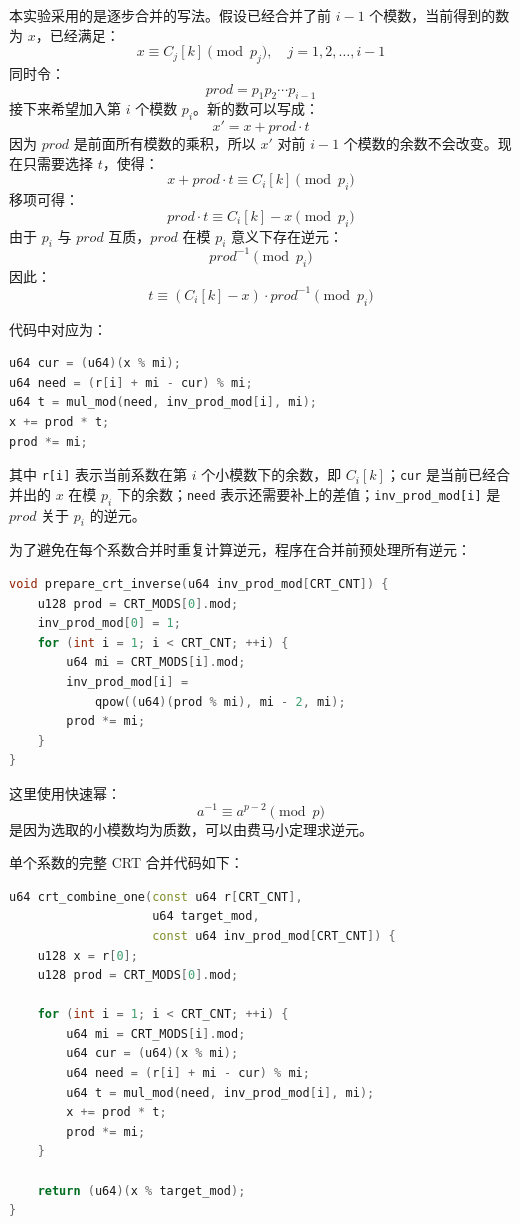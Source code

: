 \documentclass[a4paper]{article}
\begin{document}
本实验采用的是逐步合并的写法。假设已经合并了前 $i-1$ 个模数，当前得到的数为 $x$，已经满足：
\[
x\equiv C_j[k]\pmod {p_j},\quad j=1,2,\ldots,i-1
\]
同时令：
\[
prod=p_1p_2\cdots p_{i-1}
\]
接下来希望加入第 $i$ 个模数 $p_i$。新的数可以写成：
\[
x'=x+prod\cdot t
\]
因为 $prod$ 是前面所有模数的乘积，所以 $x'$ 对前 $i-1$ 个模数的余数不会改变。现在只需要选择 $t$，使得：
\[
x+prod\cdot t\equiv C_i[k]\pmod {p_i}
\]
移项可得：
\[
prod\cdot t\equiv C_i[k]-x\pmod {p_i}
\]
由于 $p_i$ 与 $prod$ 互质，$prod$ 在模 $p_i$ 意义下存在逆元：
\[
prod^{-1}\pmod {p_i}
\]
因此：
\[
t\equiv (C_i[k]-x)\cdot prod^{-1}\pmod {p_i}
\]

代码中对应为：

\begin{lstlisting}[title=CRT 单步合并公式,frame=trbl,language={C++}]
u64 cur = (u64)(x % mi);
u64 need = (r[i] + mi - cur) % mi;
u64 t = mul_mod(need, inv_prod_mod[i], mi);
x += prod * t;
prod *= mi;
\end{lstlisting}

其中 \texttt{r[i]} 表示当前系数在第 $i$ 个小模数下的余数，即 $C_i[k]$；\texttt{cur} 是当前已经合并出的 $x$ 在模 $p_i$ 下的余数；\texttt{need} 表示还需要补上的差值；\texttt{inv\_prod\_mod[i]} 是 $prod$ 关于 $p_i$ 的逆元。

为了避免在每个系数合并时重复计算逆元，程序在合并前预处理所有逆元：

\begin{lstlisting}[title=预处理 CRT 合并所需逆元,frame=trbl,language={C++}]
void prepare_crt_inverse(u64 inv_prod_mod[CRT_CNT]) {
    u128 prod = CRT_MODS[0].mod;
    inv_prod_mod[0] = 1;
    for (int i = 1; i < CRT_CNT; ++i) {
        u64 mi = CRT_MODS[i].mod;
        inv_prod_mod[i] =
            qpow((u64)(prod % mi), mi - 2, mi);
        prod *= mi;
    }
}
\end{lstlisting}

这里使用快速幂：
\[
a^{-1}\equiv a^{p-2}\pmod p
\]
是因为选取的小模数均为质数，可以由费马小定理求逆元。

单个系数的完整 CRT 合并代码如下：

\begin{lstlisting}[title=单个系数的 CRT 合并,frame=trbl,language={C++}]
u64 crt_combine_one(const u64 r[CRT_CNT],
                    u64 target_mod,
                    const u64 inv_prod_mod[CRT_CNT]) {
    u128 x = r[0];
    u128 prod = CRT_MODS[0].mod;

    for (int i = 1; i < CRT_CNT; ++i) {
        u64 mi = CRT_MODS[i].mod;
        u64 cur = (u64)(x % mi);
        u64 need = (r[i] + mi - cur) % mi;
        u64 t = mul_mod(need, inv_prod_mod[i], mi);
        x += prod * t;
        prod *= mi;
    }

    return (u64)(x % target_mod);
}
\end{lstlisting}
\end{document}
